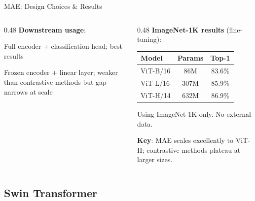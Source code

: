 \begin{frame}{MAE: Design Choices \& Results}
\begin{columns}
\begin{column}{0.48\textwidth}
      \vspace{0.3em}
      \textbf{Downstream usage}:
      \begin{description}[style=nextline, leftmargin=0.5cm]
        \item[Fine-tuning] Full encoder + classification head; best results
        \item[Linear probing] Frozen encoder + linear layer; weaker than contrastive methods but gap narrows at scale
      \end{description}
    \end{column}
    \begin{column}{0.48\textwidth}
      \textbf{ImageNet-1K results} (fine-tuning):
      \begin{center}
        \small
        \begin{tabular}{lcc}
          \toprule
          \textbf{Model} & \textbf{Params} & \textbf{Top-1} \\
          \midrule
          ViT-B/16 & 86M & 83.6\% \\
          ViT-L/16 & 307M & 85.9\% \\
          ViT-H/14 & 632M & 86.9\% \\
          \bottomrule
        \end{tabular}
      \end{center}
      Using ImageNet-1K only. No external data.

      \vspace{0.3em}
      \textbf{Key}: MAE scales excellently to ViT-H; contrastive methods plateau at larger sizes.
    \end{column}
  \end{columns}
\end{frame}

\subsection{Swin Transformer}

